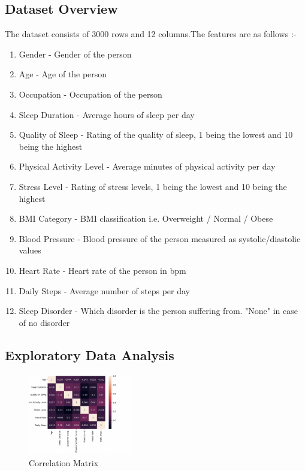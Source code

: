 \documentclass[10pt,twocolumn,letterpaper]{article}
\begin{document}
\subsection{Dataset Overview}
The dataset consists of 3000 rows and 12 columns.The features are as follows :-
\begin{enumerate}
    \item Gender - Gender of the person
    \item Age - Age of the person
    \item Occupation - Occupation of the person
    \item Sleep Duration - Average hours of sleep per day
    \item Quality of Sleep - Rating of the quality of sleep, 1 being the lowest and 10 being the highest
    \item Physical Activity Level - Average minutes of physical activity per day
    \item Stress Level - Rating of stress levels, 1 being the lowest and 10 being the highest
    \item BMI Category - BMI classification i.e. Overweight / Normal / Obese
    \item Blood Pressure - Blood pressure of the person measured as systolic/diastolic values
    \item Heart Rate - Heart rate of the person in bpm
    \item Daily Steps - Average number of steps per day
    \item Sleep Disorder - Which disorder is the person suffering from. "None" in case of no disorder
\end{enumerate}

\subsection{Exploratory Data Analysis}
\begin{figure}[H]
    \centering
    \includegraphics[width=0.4\textwidth]{CorrMat.png} %
    \caption{Correlation Matrix}
\end{figure} 
\end{document}
